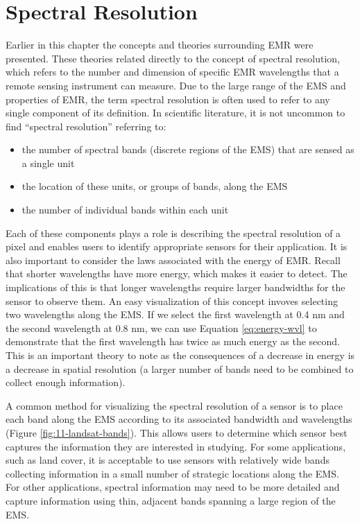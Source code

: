 \documentclass[
]{book}
\providecommand{\tightlist}{%
  \setlength{\itemsep}{0pt}\setlength{\parskip}{0pt}}
\begin{document}
\section{Spectral Resolution}\label{spectral-resolution}

Earlier in this chapter the concepts and theories surrounding EMR were presented. These theories related directly to the concept of spectral resolution, which refers to the number and dimension of specific EMR wavelengths that a remote sensing instrument can measure. Due to the large range of the EMS and properties of EMR, the term spectral resolution is often used to refer to any single component of its definition. In scientific literature, it is not uncommon to find ``spectral resolution'' referring to:

\begin{itemize}
\tightlist
\item
  the number of spectral bands (discrete regions of the EMS) that are sensed as a single unit
\item
  the location of these units, or groups of bands, along the EMS
\item
  the number of individual bands within each unit
\end{itemize}

Each of these components plays a role is describing the spectral resolution of a pixel and enables users to identify appropriate sensors for their application. It is also important to consider the laws associated with the energy of EMR. Recall that shorter wavelengths have more energy, which makes it easier to detect. The implications of this is that longer wavelengths require larger bandwidths for the sensor to observe them. An easy visualization of this concept invoves selecting two wavelengths along the EMS. If we select the first wavelength at 0.4 nm and the second wavelength at 0.8 nm, we can use Equation \eqref{eq:energy-wvl} to demonstrate that the first wavelength has twice as much energy as the second. This is an important theory to note as the consequences of a decrease in energy is a decrease in spatial resolution (a larger number of bands need to be combined to collect enough information).

A common method for visualizing the spectral resolution of a sensor is to place each band along the EMS according to its associated bandwidth and wavelengths (Figure \ref{fig:11-landsat-bands}). This allows users to determine which sensor best captures the information they are interested in studying. For some applications, such as land cover, it is acceptable to use sensors with relatively wide bands collecting information in a small number of strategic locations along the EMS. For other applications, spectral information may need to be more detailed and capture information using thin, adjacent bands spanning a large region of the EMS.
\end{document}

